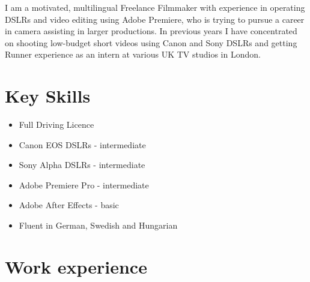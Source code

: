 \documentclass[10pt,a4paper,roman]{moderncv}
\title{\jobtitle}
\newcommand{\jobtitle}{Freelance Filmmaker}
\begin{document}
\makecvtitle

\vspace{-2.5em}

I am a motivated, multilingual \jobtitle{} with experience in operating DSLRs and video editing using Adobe Premiere, who is trying to pursue a career in camera assisting in larger productions. In previous years I have concentrated on shooting low-budget short videos using Canon and Sony DSLRs and getting Runner experience as an intern at various UK TV studios in London.

\section{Key Skills}
\vspace{-1em}
\begin{multicols}{2}
\begin{itemize}
\item Full Driving Licence
\item Canon EOS DSLRs - intermediate
\item Sony Alpha DSLRs - intermediate
\item Adobe Premiere Pro - intermediate
\item Adobe After Effects - basic
\item Fluent in German, Swedish and Hungarian
\end{itemize}
\end{multicols}

\section{Work experience}

\end{document}
